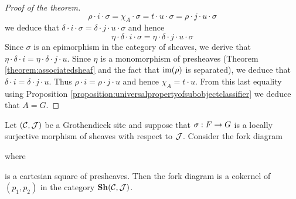 \begin{proof}[Proof of the theorem]
$$\rho\cdot i\cdot \sigma = \chi_A\cdot \sigma = t\cdot u\cdot \sigma = \rho\cdot j\cdot u\cdot \sigma$$
we deduce that $\delta \cdot i\cdot \sigma = \delta\cdot j\cdot u\cdot \sigma$ and hence
$$\eta\cdot \delta\cdot i \cdot \sigma = \eta\cdot \delta\cdot j\cdot u\cdot \sigma$$
Since $\sigma$ is an epimorphism in the category of sheaves, we derive that $\eta\cdot \delta \cdot i = \eta\cdot \delta\cdot j\cdot u$. Since $\eta$ is a monomorphism of presheaves (Theorem \ref{theorem:associatedsheaf} and the fact that $\mathrm{im}(\rho)$ is separated), we deduce that $\delta\cdot i = \delta \cdot j\cdot u$. Thus $\rho \cdot i = \rho\cdot j\cdot u$ and hence $\chi_A = t\cdot u$. From this last equality using Proposition \ref{proposition:universalpropertyofsubobjectclassifier} we deduce that $A = G$.
\end{proof}

\begin{theorem}
Let $({\mathcal C},{\mathcal J})$ be a Grothendieck site and suppose that $\sigma:F\rightarrow G$ is a locally surjective morphism of sheaves with respect to ${\mathcal J}$. Consider the fork diagram
\begin{center}
\end{center}
where
\begin{center}
\end{center}
is a cartesian square of presheaves. Then the fork diagram is a cokernel of $(p_1,p_2)$ in the category $\mathbf{Sh}({\mathcal C},{\mathcal J})$.
\end{theorem}

